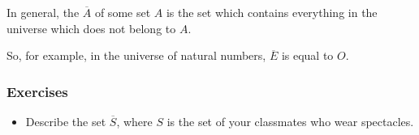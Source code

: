 \documentclass{article}
\begin{document}
In general, the $\overline{A}$ of some set $A$ is the set which contains everything
in the universe which does not belong to $A$.

So, for example, in the universe of natural numbers, $\overline{E}$ is equal to $O$.

\subsubsection{Exercises}
\begin{itemize}
	\item Describe the set $\overline{S}$, where $S$ is the set of your classmates
	who wear spectacles.
\end{itemize}

%
%
%
%
%
%
%
%
\end{document}
